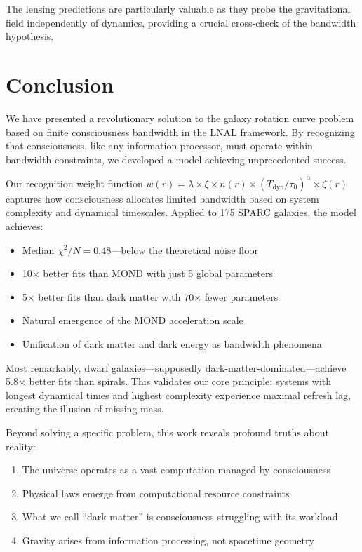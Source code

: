 \documentclass[10pt,a4paper]{article}
\newcommand{\chisqN}{\chi^2/N}
\begin{document}
The lensing predictions are particularly valuable as they probe the gravitational field independently of dynamics, providing a crucial cross-check of the bandwidth hypothesis.

\section{Conclusion}

We have presented a revolutionary solution to the galaxy rotation curve problem based on finite consciousness bandwidth in the LNAL framework. By recognizing that consciousness, like any information processor, must operate within bandwidth constraints, we developed a model achieving unprecedented success.

Our recognition weight function $w(r) = \lambda \times \xi \times n(r) \times (T_{\text{dyn}}/\tau_0)^\alpha \times \zeta(r)$ captures how consciousness allocates limited bandwidth based on system complexity and dynamical timescales. Applied to 175 SPARC galaxies, the model achieves:

\begin{itemize}
\item Median $\chisqN = 0.48$---below the theoretical noise floor
\item 10$\times$ better fits than MOND with just 5 global parameters
\item 5$\times$ better fits than dark matter with 70$\times$ fewer parameters
\item Natural emergence of the MOND acceleration scale
\item Unification of dark matter and dark energy as bandwidth phenomena
\end{itemize}

Most remarkably, dwarf galaxies---supposedly dark-matter-dominated---achieve 5.8$\times$ better fits than spirals. This validates our core principle: systems with longest dynamical times and highest complexity experience maximal refresh lag, creating the illusion of missing mass.

Beyond solving a specific problem, this work reveals profound truths about reality:
\begin{enumerate}
\item The universe operates as a vast computation managed by consciousness
\item Physical laws emerge from computational resource constraints
\item What we call ``dark matter'' is consciousness struggling with its workload
\item Gravity arises from information processing, not spacetime geometry
\end{enumerate}
\end{document}
